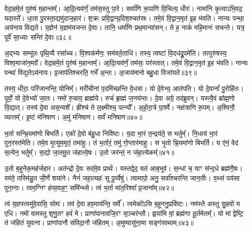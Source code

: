 वेदा॒हमे॒तं पुरु॑षं म॒हान्तम्᳚। 
आ॒दि॒त्यव॑र्णं॒ तम॑स॒स्तु पा॒रे। 
सर्वा॑णि रू॒पाणि॑ वि॒चित्य॒ धीरः॑। 
नामा॑नि कृ॒त्वाऽभि॒वद॒\an{} यदास्ते᳚। 
धा॒ता पु॒रस्ता॒द्यमु॑दाज॒हार॑। 
श॒क्रः प्रवि॒द्वान्प्र॒दिश॒श्चत॑स्रः। 
तमे॒वं वि॒द्वान॒मृत॑ इ॒ह भ॑वति। 
नान्यः पन्था॒ अय॑नाय विद्यते। 
य॒ज्ञेन॑ य॒ज्ञम॑यजन्त दे॒वाः। 
तानि॒ धर्मा॑णि प्रथ॒मान्या॑सन्। 
ते ह॒ नाकं॑ महि॒मानः॑ सचन्ते। 
यत्र॒ पूर्वे॑ सा॒ध्याः सन्ति॑ दे॒वाः॥३८॥

अ॒द्भ्यः सम्भू॑तः पृथि॒व्यै रसा᳚च्च। 
वि॒श्वक॑र्मणः॒ सम॑वर्त॒ताधि॑। 
तस्य॒ त्वष्टा॑ वि॒दध॑द्रू॒पमे॑ति। 
तत्पुरु॑षस्य॒ विश्व॒माजा॑न॒मग्रे᳚। 
वेदा॒हमे॒तं पुरु॑षं म॒हान्तम्᳚। 
आ॒दि॒त्यव॑र्णं॒ तम॑सः॒ पर॑स्तात्। 
तमे॒वं वि॒द्वान॒मृत॑ इ॒ह भ॑वति। 
नान्यः पन्था॑ विद्य॒तेऽय॑नाय। 
प्र॒जाप॑तिश्चरति॒ गर्भे॑ अ॒न्तः। 
अ॒जाय॑मानो बहु॒धा विजा॑यते॥३९॥

तस्य॒ धीराः॒ परि॑जानन्ति॒ योनिम्᳚। 
मरी॑चीनां प॒दमि॑च्छन्ति वे॒धसः॑। 
यो दे॒वेभ्य॒ आत॑पति। 
यो दे॒वानां᳚ पु॒रोहि॑तः। 
पूर्वो॒ यो दे॒वेभ्यो॑ जा॒तः। 
नमो॑ रु॒चाय॒ ब्राह्म॑ये। 
रुचं॑ ब्रा॒ह्मं ज॒नय॑न्तः। 
दे॒वा अग्रे॒ तद॑ब्रुवन्। 
यस्त्वै॒वं ब्रा᳚ह्म॒णो वि॒द्यात्। 
तस्य॑ दे॒वा अस॒न्वशे᳚। 
ह्रीश्च॑ ते ल॒क्ष्मीश्च॒ पत्न्यौ᳚। 
अ॒हो॒रा॒त्रे पा॒र्श्वे। 
नक्ष॑त्राणि रू॒पम्। 
अ॒श्विनौ॒ व्यात्तम्᳚। 
इ॒ष्टं म॑निषाण। 
अ॒मुं म॑निषाण। 
सर्वं॑ मनिषाण॥४०॥
\anuvakamend[जा॒य॒ते॒ वशे॑ स॒प्त च॑]

भ॒र्ता सन्भ्रि॒यमा॑णो बिभर्ति। 
एको॑ दे॒वो ब॑हु॒धा निवि॑ष्टः। 
य॒दा भा॒रं त॒न्द्रय॑ते॒ स भर्तुम्᳚। 
नि॒धाय॑ भा॒रं पुन॒रस्त॑मेति। 
तमे॒व मृ॒त्युम॒मृतं॒ तमा॑हुः। 
तं भ॒र्तारं॒ तमु॑ गो॒प्तार॑माहुः। 
स भृ॒तो भ्रि॒यमा॑णो बिभर्ति। 
य ए॑नं॒ वेद॑ स॒त्येन॒ भर्तुम्᳚। 
स॒द्यो जा॒तमु॒त ज॑हात्ये॒षः। 
उ॒तो जर॑न्तं॒ न ज॑हा॒त्येकम्᳚॥४१॥

उ॒तो ब॒हूनेक॒मह॑र्जहार। 
अत॑न्द्रो दे॒वः सद॑मे॒व प्रार्थः॑। 
यस्तद्वेद॒ यत॑ आब॒भूव॑। 
स॒न्धां च॒ याꣳ स॑न्द॒धे ब्रह्म॑णै॒षः। 
रम॑ते॒ तस्मि॑न्नु॒त जी॒र्णे शया॑ने। 
नैनं॑ जहा॒त्यहः॑ सु पू॒र्व्येषु॑। 
त्वामापो॒ अनु॒ सर्वा᳚श्चरन्ति जान॒तीः। 
व॒थ्सं पय॑सा पुना॒नाः। 
त्वम॒ग्निꣳ ह॑व्य॒वाह॒ꣳ॒ समि᳚न्थ्से। 
त्वं भ॒र्ता मा॑त॒रिश्वा᳚ प्र॒जाना᳚म्॥४२॥

त्वं य॒ज्ञस्त्वमु॑वे॒वासि॒ सोमः॑। 
तव॑ दे॒वा हव॒माय॑न्ति॒ सर्वे᳚। 
त्वमेको॑ऽसि ब॒हूननु॒प्रवि॑ष्टः। 
नम॑स्ते अस्तु सु॒हवो॑ म एधि। 
नमो॑ वामस्तु शृणु॒तꣳ हवं॑ मे। 
प्राणा॑पानावजि॒रꣳ स॒ञ्चर॑न्तौ। 
ह्वया॑मि वां॒ ब्रह्म॑णा तू॒र्तमेतम्᳚। 
यो मां द्वेेष्टि॒ तं ज॑हितं युवाना। 
प्राणा॑पानौ संविदा॒नौ ज॑हितम्। 
अ॒मुष्यासु॑ना॒मा सङ्ग॑साथाम्॥४३॥

